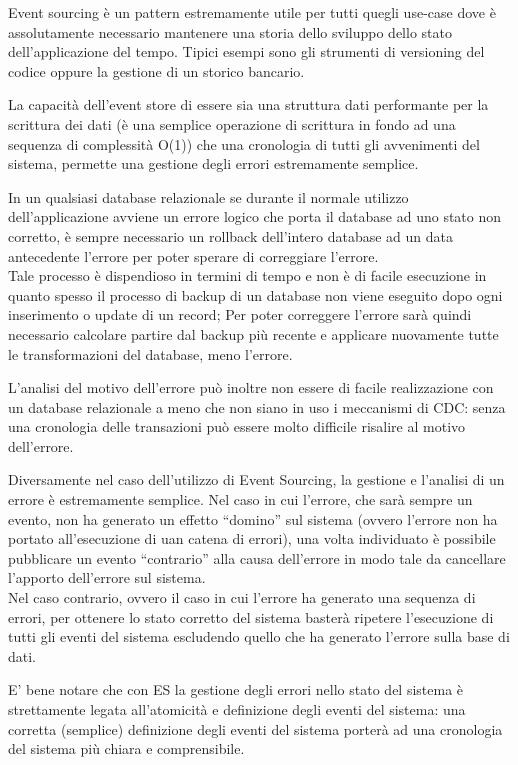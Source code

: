 \documentclass[]{article}
\begin{document}
Event sourcing è un pattern estremamente utile per tutti quegli use-case
dove è assolutamente necessario mantenere una storia dello sviluppo
dello stato dell'applicazione del tempo. Tipici esempi sono gli
strumenti di versioning del codice oppure la gestione di un storico
bancario.

La capacità dell'event store di essere sia una struttura dati
performante per la scrittura dei dati (è una semplice operazione di
scrittura in fondo ad una sequenza di complessità O(1)) che una
cronologia di tutti gli avvenimenti del sistema, permette una gestione
degli errori estremamente semplice.

In un qualsiasi database relazionale se durante il normale utilizzo
dell'applicazione avviene un errore logico che porta il database ad uno
stato non corretto, è sempre necessario un rollback dell'intero database
ad un data antecedente l'errore per poter sperare di correggiare
l'errore.\\
Tale processo è dispendioso in termini di tempo e non è di facile
esecuzione in quanto spesso il processo di backup di un database non
viene eseguito dopo ogni inserimento o update di un record; Per poter
correggere l'errore sarà quindi necessario calcolare partire dal backup
più recente e applicare nuovamente tutte le transformazioni del
database, meno l'errore.

L'analisi del motivo dell'errore può inoltre non essere di facile
realizzazione con un database relazionale a meno che non siano in uso i
meccanismi di CDC: senza una cronologia delle transazioni può essere
molto difficile risalire al motivo dell'errore.

Diversamente nel caso dell'utilizzo di Event Sourcing, la gestione e
l'analisi di un errore è estremamente semplice. Nel caso in cui
l'errore, che sarà sempre un evento, non ha generato un effetto
``domino'' sul sistema (ovvero l'errore non ha portato all'esecuzione di
uan catena di errori), una volta individuato è possibile pubblicare un
evento ``contrario'' alla causa dell'errore in modo tale da cancellare
l'apporto dell'errore sul sistema.\\
Nel caso contrario, ovvero il caso in cui l'errore ha generato una
sequenza di errori, per ottenere lo stato corretto del sistema basterà
ripetere l'esecuzione di tutti gli eventi del sistema escludendo quello
che ha generato l'errore sulla base di dati.

E' bene notare che con ES la gestione degli errori nello stato del
sistema è strettamente legata all'atomicità e definizione degli eventi
del sistema: una corretta (semplice) definizione degli eventi del
sistema porterà ad una cronologia del sistema più chiara e
comprensibile.
\end{document}
